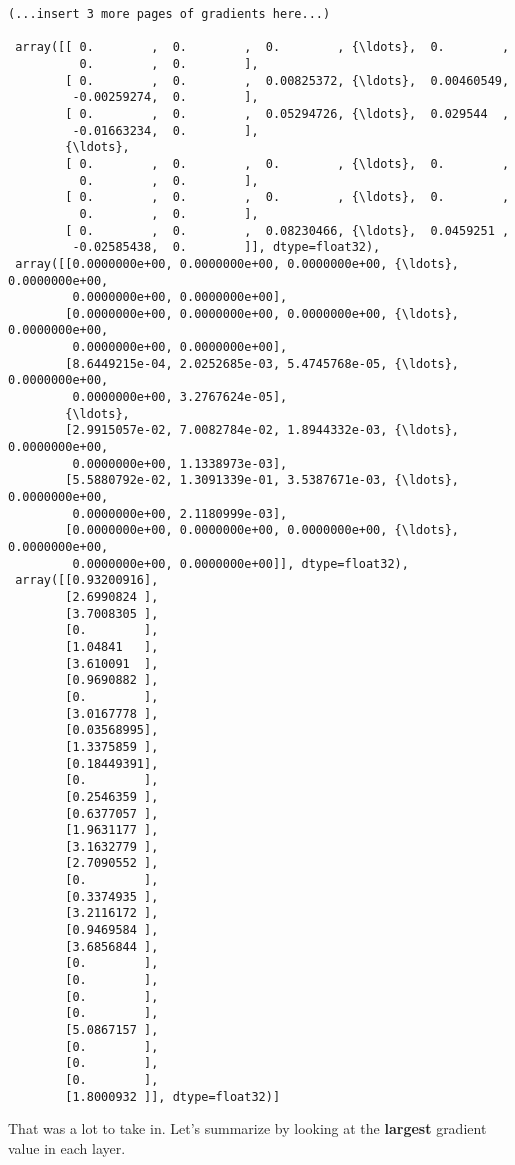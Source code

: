 \documentclass[11pt]{article}
\begin{document}
\begin{tcolorbox}[breakable, size=fbox, boxrule=.5pt, pad at break*=1mm, opacityfill=0]
\begin{Verbatim}[commandchars=\\\{\}]
(...insert 3 more pages of gradients here...)

 array([[ 0.        ,  0.        ,  0.        , {\ldots},  0.        ,
          0.        ,  0.        ],
        [ 0.        ,  0.        ,  0.00825372, {\ldots},  0.00460549,
         -0.00259274,  0.        ],
        [ 0.        ,  0.        ,  0.05294726, {\ldots},  0.029544  ,
         -0.01663234,  0.        ],
        {\ldots},
        [ 0.        ,  0.        ,  0.        , {\ldots},  0.        ,
          0.        ,  0.        ],
        [ 0.        ,  0.        ,  0.        , {\ldots},  0.        ,
          0.        ,  0.        ],
        [ 0.        ,  0.        ,  0.08230466, {\ldots},  0.0459251 ,
         -0.02585438,  0.        ]], dtype=float32),
 array([[0.0000000e+00, 0.0000000e+00, 0.0000000e+00, {\ldots}, 0.0000000e+00,
         0.0000000e+00, 0.0000000e+00],
        [0.0000000e+00, 0.0000000e+00, 0.0000000e+00, {\ldots}, 0.0000000e+00,
         0.0000000e+00, 0.0000000e+00],
        [8.6449215e-04, 2.0252685e-03, 5.4745768e-05, {\ldots}, 0.0000000e+00,
         0.0000000e+00, 3.2767624e-05],
        {\ldots},
        [2.9915057e-02, 7.0082784e-02, 1.8944332e-03, {\ldots}, 0.0000000e+00,
         0.0000000e+00, 1.1338973e-03],
        [5.5880792e-02, 1.3091339e-01, 3.5387671e-03, {\ldots}, 0.0000000e+00,
         0.0000000e+00, 2.1180999e-03],
        [0.0000000e+00, 0.0000000e+00, 0.0000000e+00, {\ldots}, 0.0000000e+00,
         0.0000000e+00, 0.0000000e+00]], dtype=float32),
 array([[0.93200916],
        [2.6990824 ],
        [3.7008305 ],
        [0.        ],
        [1.04841   ],
        [3.610091  ],
        [0.9690882 ],
        [0.        ],
        [3.0167778 ],
        [0.03568995],
        [1.3375859 ],
        [0.18449391],
        [0.        ],
        [0.2546359 ],
        [0.6377057 ],
        [1.9631177 ],
        [3.1632779 ],
        [2.7090552 ],
        [0.        ],
        [0.3374935 ],
        [3.2116172 ],
        [0.9469584 ],
        [3.6856844 ],
        [0.        ],
        [0.        ],
        [0.        ],
        [0.        ],
        [5.0867157 ],
        [0.        ],
        [0.        ],
        [0.        ],
        [1.8000932 ]], dtype=float32)]
\end{Verbatim}
\end{tcolorbox}
        
        
        \newpage
        
        That was a lot to take in.  Let's summarize by looking at the \textbf{largest} gradient value in each layer.
        
\end{document}
